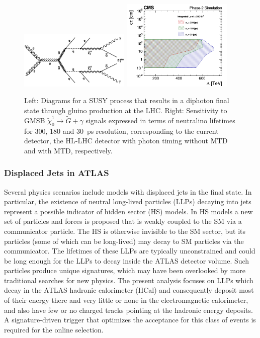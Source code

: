 \begin{figure}[t]\begin{center}
\includegraphics[width=0.47\textwidth]{figures/MTD/diagram.png}
\includegraphics[width=0.47\textwidth]{figures/MTD/Limits_excl_2D_ComparingRes.png}
\caption{ 
Left: Diagrams for a SUSY process that results in a diphoton final state through gluino production at the LHC. Right: Sensitivity to GMSB $\tilde{\chi}_0^1 \to \tilde{G} + \gamma$ signals expressed in terms of neutralino lifetimes for 300, 180 and 30~ps resolution, corresponding to the current detector, the HL-LHC detector with photon timing without MTD and with MTD, respectively.
}
\label{fig:cmsupgrade_photon}
\end{center}
\end{figure}

\subsubsection{Displaced Jets in ATLAS}

Several physics scenarios include models with displaced jets in the final state.  In particular, the existence of neutral long-lived particles (LLPs) decaying into jets represent a possible indicator of hidden sector (HS) models. In HS models a new set of particles and forces is proposed that is weakly coupled to the SM via a communicator particle. The HS is otherwise invisible to the SM sector, but its particles (some of which can be long-lived) may decay to SM particles via the communicator. The lifetimes of these LLPs are typically unconstrained and could be long enough for the LLPs to decay inside the ATLAS detector volume.
Such particles produce unique signatures, which may have been overlooked by more traditional searches for new physics.
The present analysis focuses on LLPs which decay in the ATLAS hadronic calorimeter (HCal) and consequently deposit most of their energy there and very little or none in the electromagnetic calorimeter, and also have few or no charged tracks pointing at the hadronic energy deposits. A signature-driven trigger that optimizes the acceptance for this class of events is required for the online selection. 

